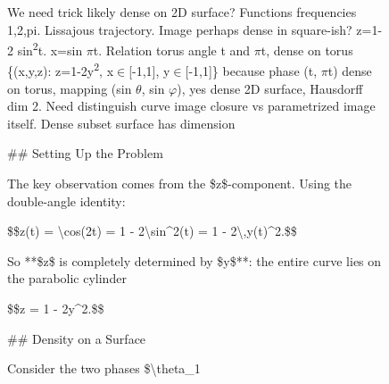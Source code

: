 \begin{figure}[t]
\begin{reasoncol}[equal height group=reasX1]
  \caret{}\par\vspace{4pt}
  \raggedright We need trick likely dense on 2D surface? Functions frequencies 1,2,pi. Lissajous trajectory. Image perhaps dense in square-ish? z=1-2 sin\textsuperscript{2}t. x=sin \(\pi\)t. Relation torus angle t and \(\pi\)t, dense on torus \{(x,y,z): z=1-2y\textsuperscript{2}, x\(\in\)[-1,1], y\(\in\)[-1,1]\} because phase (t, \(\pi\)t) dense on torus, mapping (sin \(\theta\), sin \(\varphi\)), yes dense 2D surface, Hausdorff dim 2. Need distinguish curve image closure vs parametrized image itself. Dense subset surface has dimension\par\vspace{3pt}\elide
\end{reasoncol}
\vspace{12pt}
\noindent
\begin{answercol}[equal height group=ansX1]
  \caret{}\par\vspace{4pt}
  \raggedright \#\# Setting Up the Problem\par\vspace{2pt}
  The key observation comes from the \$z\$-component. Using the double-angle identity:\par\vspace{2pt}
  \$\$z(t) = \textbackslash{}cos(2t) = 1 - 2\textbackslash{}sin\textasciicircum{}2(t) = 1 - 2\textbackslash{},y(t)\textasciicircum{}2.\$\$\par\vspace{2pt}
  So **\$z\$ is completely determined by \$y\$**: the entire curve lies on the parabolic cylinder\par\vspace{2pt}
  \$\$z = 1 - 2y\textasciicircum{}2.\$\$\par\vspace{2pt}
  \#\# Density on a Surface\par\vspace{2pt}
  Consider the two phases \$\textbackslash{}theta\_1\par\vspace{3pt}\elide
\end{answercol}\hspace{\columnsep}%
\begin{answercol}[equal height group=ansX1]
  \caret{}\par\vspace{4pt}

\end{answercol}
\end{figure}
